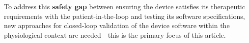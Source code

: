 To address this \textbf{safety gap} between ensuring the device satisfies its therapeutic requirements with the patient-in-the-loop and testing its software specifications, new approaches for closed-loop validation of the device software within the physiological context are needed - this is the primary focus of this article.




